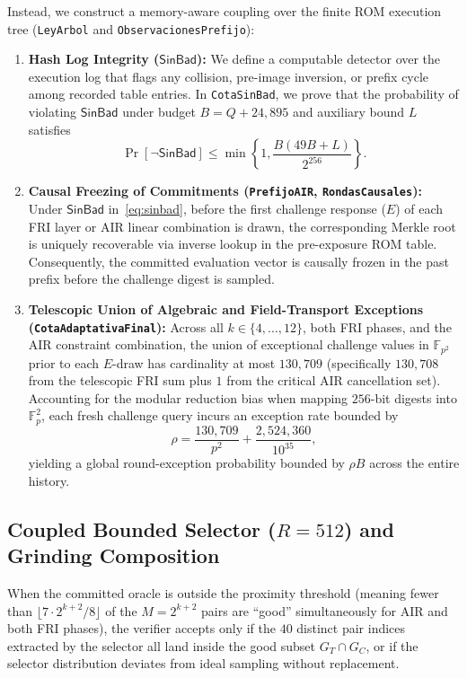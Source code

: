 \documentclass[conference]{IEEEtran}
\theoremstyle{definition}
\begin{document}
Instead, we construct a memory-aware coupling over the finite ROM execution tree (\texttt{LeyArbol} and \texttt{ObservacionesPrefijo}):
\begin{enumerate}
    \item \textbf{Hash Log Integrity ($\mathsf{SinBad}$):} We define a computable detector over the execution log that flags any collision, pre-image inversion, or prefix cycle among recorded table entries. In \texttt{CotaSinBad}, we prove that the probability of violating $\mathsf{SinBad}$ under budget $B = Q + 24{,}895$ and auxiliary bound $L$ satisfies
    \begin{equation}
    \label{eq:sinbad}
    \Pr[\lnot \mathsf{SinBad}] \le \min\left\{1, \frac{B(49B + L)}{2^{256}}\right\}.
    \end{equation}
    \item \textbf{Causal Freezing of Commitments (\texttt{PrefijoAIR}, \texttt{RondasCausales}):} Under $\mathsf{SinBad}$ in~\eqref{eq:sinbad}, before the first challenge response ($E$) of each FRI layer or AIR linear combination is drawn, the corresponding Merkle root is uniquely recoverable via inverse lookup in the pre-exposure ROM table. Consequently, the committed evaluation vector is causally frozen in the past prefix before the challenge digest is sampled.
    \item \textbf{Telescopic Union of Algebraic and Field-Transport Exceptions (\texttt{CotaAdaptativaFinal}):} Across all $k \in \{4,\dots,12\}$, both FRI phases, and the AIR constraint combination, the union of exceptional challenge values in $\mathbb{F}_{p^2}$ prior to each $E$-draw has cardinality at most $130{,}709$ (specifically $130{,}708$ from the telescopic FRI sum plus $1$ from the critical AIR cancellation set). Accounting for the modular reduction bias when mapping $256$-bit digests into $\mathbb{F}_p^2$, each fresh challenge query incurs an exception rate bounded by
    \begin{equation}
    \label{eq:rho}
    \rho = \frac{130{,}709}{p^2} + \frac{2{,}524{,}360}{10^{35}},
    \end{equation}
    yielding a global round-exception probability bounded by $\rho B$ across the entire history.
\end{enumerate}

\subsection{Coupled Bounded Selector ($R = 512$) and Grinding Composition}
When the committed oracle is outside the proximity threshold (meaning fewer than $\lfloor 7 \cdot 2^{k+2} / 8 \rfloor$ of the $M = 2^{k+2}$ pairs are ``good'' simultaneously for AIR and both FRI phases), the verifier accepts only if the $40$ distinct pair indices extracted by the selector all land inside the good subset $G_T \cap G_C$, or if the selector distribution deviates from ideal sampling without replacement.
\end{document}
